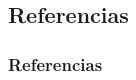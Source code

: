 \documentclass[a4paper,slidestop,xcolor=pst,dvips,blue]{beamer}
\begin{document}
\subsection{Referencias}

\begin{frame}
	\frametitle{Referencias}
	
	
\end{frame}
\end{document}
